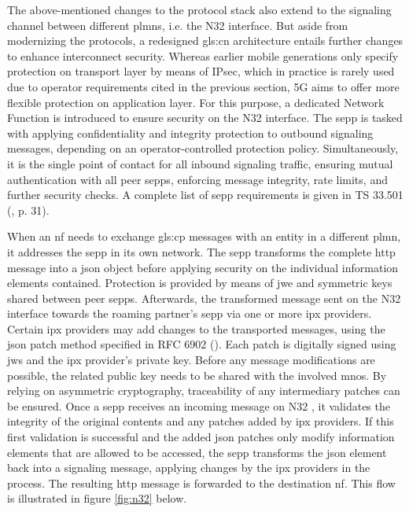 The above-mentioned changes to the protocol stack also extend to the signaling channel between different \glspl{plmn}, i.e. the N32 interface.
But aside from modernizing the protocols, a redesigned \gls{gls:cn} architecture entails further changes to enhance interconnect security.
Whereas earlier mobile generations only specify protection on transport layer by means of IPsec, which in practice is rarely used due to operator requirements cited in the previous section, 5G aims to offer more flexible protection on application layer.
For this purpose, a dedicated Network Function is introduced to ensure security on the N32 interface.
The \gls{sepp} is tasked with applying confidentiality and integrity protection to outbound signaling messages, depending on an operator-controlled protection policy.
Simultaneously, it is the single point of contact for all inbound signaling traffic, ensuring mutual authentication with all peer \glspl{sepp}, enforcing message integrity, rate limits, and further security checks.
A complete list of \gls{sepp} requirements is given in TS 33.501 (\cite{3gpp.33.501}, p. 31).

When an \gls{nf} needs to exchange \gls{gls:cp} messages with an entity in a different \gls{plmn}, it addresses the \gls{sepp} in its own network.
The \gls{sepp} transforms the complete \gls{http} message into a \gls{json} object before applying security on the individual information elements contained.
Protection is provided by means of \gls{jwe} and symmetric keys shared between peer \glspl{sepp}.
Afterwards, the transformed message sent on the N32 interface towards the roaming partner's \gls{sepp} via one or more \gls{ipx} providers.
Certain \gls{ipx} providers may add changes to the transported messages, using the \gls{json} patch method specified in RFC 6902  (\cite{rfc6902}).
Each patch is digitally signed using \gls{jws} and the \gls{ipx} provider's private key.
Before any message modifications are possible, the related public key needs to be shared with the involved \glspl{mno}.
By relying on asymmetric cryptography, traceability of any intermediary patches can be ensured.
Once a \gls{sepp} receives an incoming message on N32 , it validates the integrity of the original contents and any patches added by \gls{ipx} providers.
If this first validation is successful and the added \gls{json} patches only modify information elements that are allowed to be accessed, the \gls{sepp} transforms the \gls{json} element back into a signaling message, applying changes by the \gls{ipx} providers in the process.
The resulting \gls{http} message is forwarded to the destination \gls{nf}.
This flow is illustrated in figure \ref{fig:n32} below.

